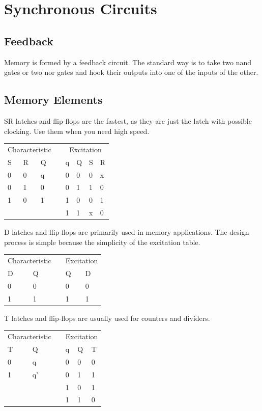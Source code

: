 \twocolumn
\chapter{Synchronous Circuits}
\label{c-Sync}

\section{Feedback}

Memory is formed by a feedback circuit.  The standard way is to take two nand gates or two nor gates and hook their outputs into one of the inputs of the other.

\section{Memory Elements}

SR latches and flip-flops are the fastest, as they are just the latch with possible clocking.  Use them when you need high speed.

\noindent
\begin{tabular}{ll||lp{.25in}ll||ll}
\multicolumn{3}{c}{Characteristic} && \multicolumn{4}{c}{Excitation} \\
S & R & Q && q & Q & S & R \\ \cline{1-3} \cline{5-8}
0 & 0 & q && 0 & 0 & 0 & x \\
0 & 1 & 0 && 0 & 1 & 1 & 0 \\
1 & 0 & 1 && 1 & 0 & 0 & 1 \\
\multicolumn{3}{c}{} && 1 & 1 & x & 0 \\
\end{tabular}

D latches and flip-flops are primarily used in memory applications.  The design process is simple because the simplicity of the excitation table.

\noindent
\begin{tabular}{l||lp{.25in}l||l}
\multicolumn{2}{c}{Characteristic} && \multicolumn{2}{c}{Excitation} \\
D & Q                && Q & D \\ \cline{1-2} \cline{4-5}
0 & 0                && 0 & 0 \\
1 & 1                && 1 & 1 \\
\end{tabular}

T latches and flip-flops are usually used for counters and dividers.

\noindent
\begin{tabular}{l||lp{.25in}ll||l}
\multicolumn{2}{c}{Characteristic} && \multicolumn{3}{c}{Excitation} \\
T & Q                && q & Q & T \\ \cline{1-2} \cline{4-6}
0 & q                && 0 & 0 & 0 \\
1 & q'               && 0 & 1 & 1 \\
\multicolumn{2}{c}{} && 1 & 0 & 1 \\
\multicolumn{2}{c}{} && 1 & 1 & 0 \\
\end{tabular}

